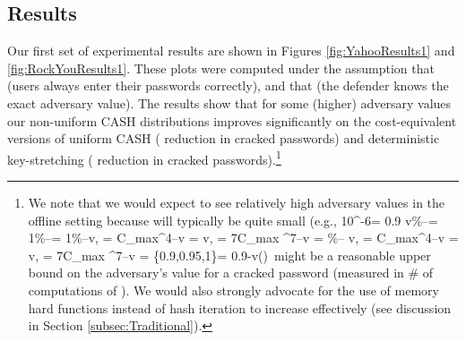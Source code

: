 \subsection{Results}
Our first set of experimental results are shown in Figures \ref{fig:YahooResults1} and \ref{fig:RockYouResults1}. These plots were computed under the assumption that  (users always enter their passwords correctly), and that  (the defender knows the exact adversary value). The results show that for some (higher) adversary values our non-uniform CASH distributions improves significantly on the cost-equivalent versions of uniform CASH ( reduction in cracked passwords) and deterministic key-stretching ( reduction in cracked passwords).\footnote{We note that we would expect to see relatively high adversary  values  in the offline setting because  will typically be quite small (e.g., 10^{-6}\alpha = 0.9 \neq v\%--\alpha = 1\%--\alpha = 1\%--\neq v,  = C_{max}^4--v = \neq v,  = 7\times C_{max} ^7--v = \%-- \neq v,  = C_{max}^4--v =  \neq v,  = 7\times C_{max} ^7--v = \alpha \in \{0.9,0.95,1\}\alpha\alpha {}\alpha\alpha\alpha = 0.9-\alpha\alphav{}v\left(\right)\ might be a reasonable upper bound on the adversary's value for a cracked password (measured in \# of computations of ). We would also strongly advocate for the use of memory hard functions instead of hash iteration to increase  effectively (see discussion in Section \ref{subsec:Traditional}). 


}
